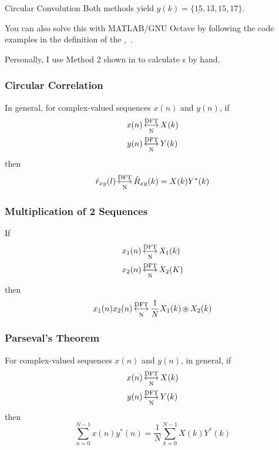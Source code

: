 \begin{example}{Circular Convolution}
  Both methods yield $y(k) = \lbrace \underline{15}, 13, 15, 17 \rbrace$.

  \begin{remark*}
    You can also solve this with MATLAB/GNU Octave by following the code examples in the definition of the ,~.
  \end{remark*}
\end{example}

\begin{remark*}
  Personally, I use Method 2 shown in  to calculate s by hand.
\end{remark*}

\subsubsection{Circular Correlation}\label{subsubsec:DFT_Properties-Circular_Correlation}
In general, for complex-valued sequences $x(n)$ and $y(n)$, if
\begin{align*}
  x(n) &\operatorname{\overset{\text{DFT}}{\underset{N}{\longleftrightarrow}}} X(k) \\
  y(n) &\operatorname{\overset{\text{DFT}}{\underset{N}{\longleftrightarrow}}} Y(k)
\end{align*}
then
\begin{equation}\label{eq:DFT_Properties-Circular_Correlation}
  \tilde{r}_{xy}(l) \operatorname{\overset{\text{DFT}}{\underset{N}{\longleftrightarrow}}} \tilde{R}_{xy}(k) = X(k)Y^{*}(k)
\end{equation}

\subsubsection{Multiplication of 2 Sequences}\label{subsubsec:DFT_Properties-2_Sequence_Multiplication}
If
\begin{align*}
  x_{1}(n) &\operatorname{\overset{\text{DFT}}{\underset{N}{\longleftrightarrow}}} X_{1}(k) \\
  x_{2}(n) &\operatorname{\overset{\text{DFT}}{\underset{N}{\longleftrightarrow}}} X_{2}(K)
\end{align*}
then
\begin{equation}\label{eq:2_Sequence_Multiplication}
  x_{1}(n)x_{2}(n) \operatorname{\overset{\text{DFT}}{\underset{N}{\longleftrightarrow}}} \frac{1}{N} X_{1}(k) \operatorname{\circledast} X_{2}(k)
\end{equation}

\subsubsection{Parseval's Theorem}\label{subsubsec:DFT_Properties-Parsevals_Theorem}
For complex-valued sequences $x(n)$ and $y(n)$, in general, if
\begin{align*}
  x(n) &\operatorname{\overset{\text{DFT}}{\underset{N}{\longleftrightarrow}}} X(k) \\
  y(n) &\operatorname{\overset{\text{DFT}}{\underset{N}{\longleftrightarrow}}} Y(k)
\end{align*}
then
\begin{equation}\label{eq:DFT_Properties-Parsevals_Theorem}
  \sum\limits_{n=0}^{N-1}x(n)y^{*}(n) = \frac{1}{N} \sum\limits_{k=0}^{N-1} X(k)Y^{*}(k)
\end{equation}

